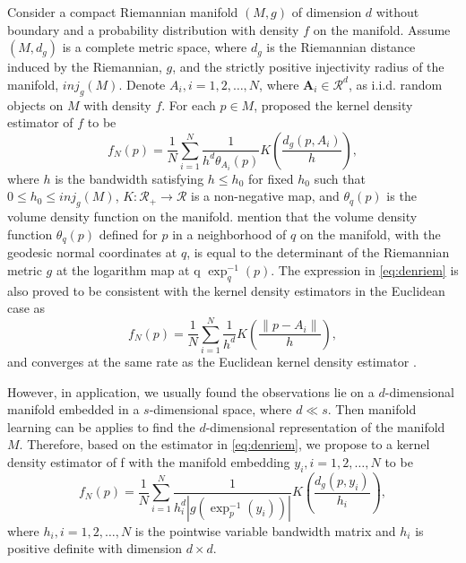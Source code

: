 \documentclass[11pt,a4paper,]{article}
\begin{document}
Consider a compact Riemannian manifold \((M, g)\) of dimension \(d\) without
boundary and a probability distribution with density \(f\) on the
manifold. Assume \((M, d_g)\) is a complete metric space, where \(d_g\) is
the Riemannian distance induced by the Riemannian, \(g\), and the strictly
positive injectivity radius \autocite{Chavel2006-mp} of the manifold,
\(inj_g(M)\). Denote \(A_i, i = 1, 2, \dots, N\), where
\(\pmb{A}_i \in \mathcal{R}^d\), as i.i.d. random objects on \(M\) with
density \(f\). For each \(p\in M\), \textcite{Pelletier2005-vu} proposed the kernel
density estimator of \(f\) to be \begin{equation}
\label{eq:denriem}
f_N(p) = \frac{1}{N} \sum_{i=1}^{N} \frac{1}{h^d \theta_{A_i}(p)} K(\frac{d_g(p, A_i)}{h}),
\end{equation} where \(h\) is the bandwidth satisfying \(h \leq h_0\) for
fixed \(h_0\) such that \(0\leq h_0\leq inj_g(M)\),
\(K: \mathcal{R}_{+} \rightarrow \mathcal{R}\) is a non-negative map, and
\(\theta_{q}(p)\) is the volume density function on the manifold.
\textcite{Pelletier2005-vu} mention that the volume density function \(\theta_q(p)\)
defined for \(p\) in a neighborhood of \(q\) on the manifold, with the
geodesic normal coordinates at \(q\), is equal to the determinant of the
Riemannian metric \(g\) at the logarithm map at q \(\exp_q^{-1}(p)\). The
expression in \eqref{eq:denriem} is also proved to be consistent with the
kernel density estimators in the Euclidean case as \begin{equation}
\label{eq:denconsist}
f_N(p) = \frac{1}{N} \sum_{i=1}^{N} \frac{1}{h^d} K(\frac{\|p-A_i\|}{h}),
\end{equation} and converges at the same rate as the Euclidean kernel
density estimator \autocite{Henry2009-ll}.

However, in application, we usually found the observations lie on a
\(d\)-dimensional manifold embedded in a \(s\)-dimensional space, where
\(d \ll s\). Then manifold learning can be applies to find the
\(d\)-dimensional representation of the manifold \(M\). Therefore, based on
the estimator in \eqref{eq:denriem}, we propose to a kernel density
estimator of f with the manifold embedding \(y_i, i = 1, 2, \dots, N\) to
be \begin{equation}
\label{eq:denestimator}
f_N(p) = \frac{1}{N} \sum_{i=1}^{N} \frac{1}{h_i^d |g(\exp_p^{-1}(y_i))|} K(\frac{d_g(p, y_i)}{h_i}),
\end{equation} where \(h_i, i = 1, 2, \dots, N\) is the pointwise variable
bandwidth matrix and \(h_i\) is positive definite with dimension
\(d\times d\).
\end{document}
